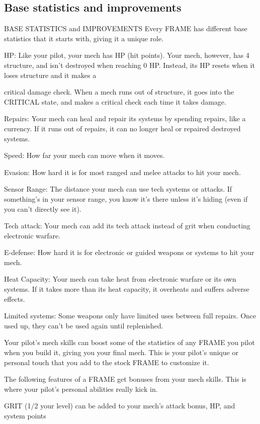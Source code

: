 \subsection{Base statistics and improvements}
                         BASE STATISTICS and IMPROVEMENTS
Every FRAME has different base statistics that it starts with, giving it a unique role.


HP: Like your pilot, your mech has HP (hit points). Your mech, however, has 4 structure, and
isn’t destroyed when reaching 0 HP. Instead, its HP resets when it loses structure and it makes a




critical damage check. When a mech runs out of structure, it goes into the CRITICAL state, and
makes a critical check each time it takes damage.

Repairs: Your mech can heal and repair its systems by spending repairs, like a currency. If it runs
out of repairs, it can no longer heal or repaired destroyed systems.

Speed: How far your mech can move when it moves.

Evasion: How hard it is for most ranged and melee attacks to hit your mech.

Sensor Range: The distance your mech can use tech systems or attacks. If something’s in your
sensor range, you know it’s there unless it’s hiding (even if you can’t directly see it).

Tech attack: Your mech can add its tech attack instead of grit when conducting electronic
warfare.

E-defense: How hard it is for electronic or guided weapons or systems to hit your mech.

Heat Capacity: Your mech can take heat from electronic warfare or its own systems. If it takes
more than its heat capacity, it overheats and suffers adverse effects.

Limited systems: Some weapons only have limited uses between full repairs. Once used up,
they can’t be used again until replenished.


Your pilot’s mech skills can boost some of the statistics of any FRAME you pilot when you build
it, giving you your final mech. This is your pilot’s unique or personal touch that you add to the
stock FRAME to customize it.


The following features of a FRAME get bonuses from your mech skills. This is where your pilot’s
personal abilities really kick in.


GRIT (1/2 your level) can be added to your mech’s attack bonus, HP, and system points


